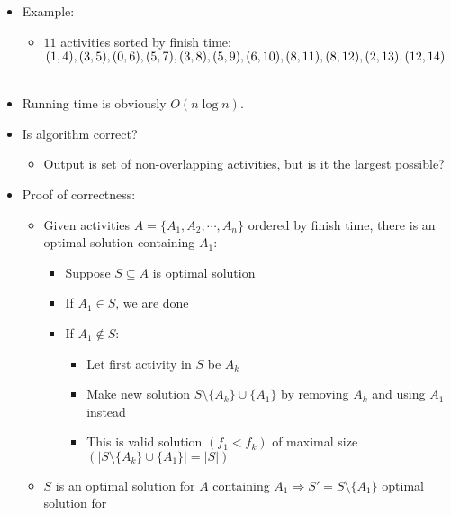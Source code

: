 \documentclass[11pt]{article}
\begin{document}
\begin{itemize}
\item Example:
        \begin{itemize}
        \item $11$ activities sorted by finish time: $(1,4),(3,5),(0,6),(5,7),(3,8),(5,9), \\
        (6,10),(8,11),(8,12),(2,13),(12,14)$ \\ \\
        \end{itemize}
\item Running time is obviously $O(n\log n)$.


\item Is algorithm correct?
        \begin{itemize}
        \item Output is set of non-overlapping activities, but is it the
        largest possible?
        \end{itemize}
\item Proof of correctness:
        \begin{itemize}
        \item Given activities $A = \{A_1,A_2, \cdots ,A_n \}$ ordered
        by finish time, there is an optimal solution containing $A_1$:
                \begin{itemize}
                \item Suppose $S \subseteq A$ is optimal solution
                \item If $A_1 \in S$, we are done
                \item If $A_1 \notin S$:
                        \begin{itemize}
                        \item Let first activity in $S$ be $A_k$
                        \item Make new solution $S \setminus \{A_k \}
                        \cup \{ A_1 \}$ by removing $A_k$ and using $A_1$
                        instead
                        \item This is valid solution $(f_1 < f_k)$ of
                        maximal size $( \vert S \setminus \{A_k \}
                        \cup \{ A_1 \} \vert = \vert S \vert)$
                        \end{itemize}
                \end{itemize}
        \item $S$ is an optimal solution for $A$ containing $A_1
        \Rightarrow S' = S \setminus \{A_1 \}$ optimal solution for 

\end{itemize}
\end{itemize}
\end{document}
